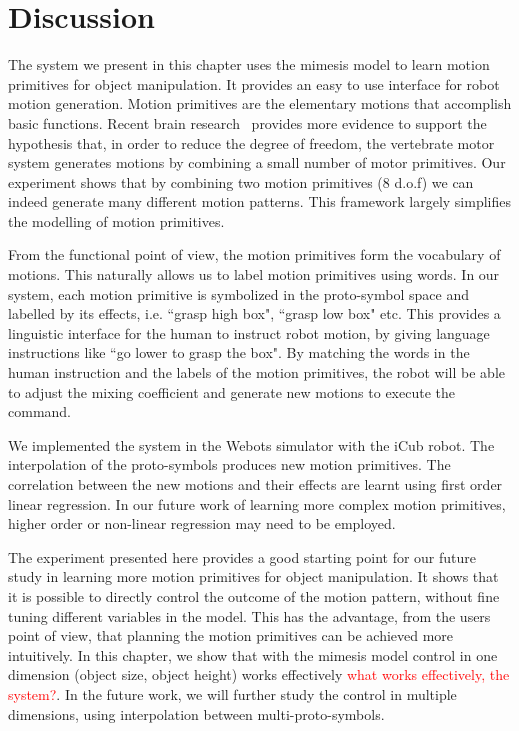 \section{Discussion}
\label{cha5:sec4}

The system we present in this chapter uses the mimesis model to learn motion primitives for object manipulation. It provides an easy to use interface for robot motion generation. Motion primitives are the elementary motions that accomplish basic functions. Recent brain research~\cite{bizzi2008combining} provides more evidence to support the hypothesis that, in order to reduce the degree of freedom, the vertebrate motor system generates motions by combining a small number of motor primitives. Our experiment shows that by combining two motion primitives (8 d.o.f) we can indeed generate many different motion patterns. This framework largely simplifies the modelling of motion primitives.

From the functional point of view, the motion primitives form the vocabulary of motions. This naturally allows us to label motion primitives using words. In our system, each motion primitive is symbolized in the proto-symbol space and labelled by its effects, i.e. ``grasp high box", ``grasp low box" etc. This provides a linguistic interface for the human to instruct robot motion, by giving language instructions like ``go lower to grasp the box". By matching the words in the human instruction and the labels of the motion primitives, the robot will be able to adjust the mixing coefficient and generate new motions to execute the command.

We implemented the system in the Webots simulator with the iCub robot. The interpolation of the proto-symbols produces new motion primitives. The correlation between the new motions and their effects are learnt using first order linear regression. In our future work of learning more complex motion primitives, higher order or non-linear regression may need to be employed.

The experiment presented here provides a good starting point for our future study in learning more motion primitives for object manipulation. It shows that it is possible to directly control the outcome of the motion pattern, without fine tuning different variables in the model. This has the advantage, from the users point of view, that planning the motion primitives can be achieved more intuitively. In this chapter, we show that with the mimesis model control in one dimension (object size, object height) works effectively \textcolor{red}{what works effectively, the system?}. In the future work, we will further study the control in multiple dimensions, using interpolation between multi-proto-symbols.
